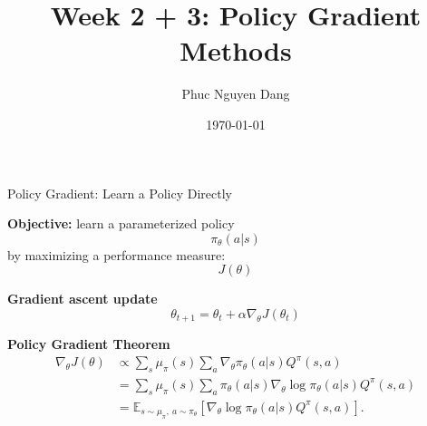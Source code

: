 \documentclass{beamer}
\title{Week 2 + 3: Policy Gradient Methods}
\author{Phuc Nguyen Dang}
\date{\today}
\begin{document}
\frame{\titlepage}

\begin{frame}{Policy Gradient: Learn a Policy Directly}

\textbf{Objective:} learn a parameterized policy
\[
\pi_\theta(a|s)
\]
by maximizing a performance measure:
\[
J(\theta)
\]

\vspace{0.2cm}

\textbf{Gradient ascent update}
\[
\theta_{t+1}
=
\theta_t + \alpha \nabla_\theta J(\theta_t)
\]

\vspace{0.2cm}

\textbf{Policy Gradient Theorem}
\[
\begin{aligned}
\nabla_\theta J(\theta)
&\propto
\sum_s \mu_\pi(s)
\sum_a
\nabla_\theta \pi_\theta(a|s) Q^\pi(s,a) \\
&=
\sum_s \mu_\pi(s)
\sum_a
\pi_\theta(a|s)
\nabla_\theta \log \pi_\theta(a|s)
Q^\pi(s,a) \\
&=
\mathbb{E}_{s \sim \mu_\pi,\ a \sim \pi_\theta}
\left[
\nabla_\theta \log \pi_\theta(a|s) Q^\pi(s,a)
\right].
\end{aligned}
\]
\end{frame}
\end{document}
